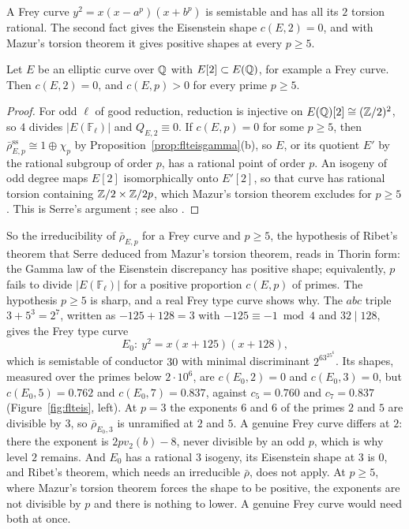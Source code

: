A Frey curve $y^2=x(x-a^p)(x+b^p)$ is semistable and has all its $2$ torsion rational. The second fact gives the Eisenstein shape $c(E,2)=0$, and with Mazur's torsion theorem it gives positive shapes at every $p\ge5$.

\begin{proposition}\label{prop:flteisfrey}
Let $E$ be an elliptic curve over $\mathbb{Q}$ with $E[2]\subset E(\mathbb{Q})$, for example a Frey curve. Then $c(E,2)=0$, and $c(E,p)>0$ for every prime $p\ge5$.
\end{proposition}

\begin{proof}
For odd $\ell$ of good reduction, reduction is injective on $E(\mathbb{Q})[2]\cong(\mathbb{Z}/2)^2$, so $4$ divides $|E(\mathbb F_\ell)|$ and $Q_{E,2}\equiv0$. If $c(E,p)=0$ for some $p\ge5$, then $\bar\rho_{E,p}^{\mathrm{ss}}\cong1\oplus\chi_p$ by Proposition~\ref{prop:flteisgamma}(b), so $E$, or its quotient $E'$ by the rational subgroup of order $p$, has a rational point of order $p$. An isogeny of odd degree maps $E[2]$ isomorphically onto $E'[2]$, so that curve has rational torsion containing $\mathbb{Z}/2\times\mathbb{Z}/2p$, which Mazur's torsion theorem \cite{mazur1977} excludes for $p\ge5$. This is Serre's argument \cite{serre1987}; see also \cite[Theorem~2.9(c)]{ddt1995}.
\end{proof}

So the irreducibility of $\bar\rho_{E,p}$ for a Frey curve and $p\ge5$, the hypothesis of Ribet's theorem that Serre deduced from Mazur's torsion theorem, reads in Thorin form: the Gamma law of the Eisenstein discrepancy has positive shape; equivalently, $p$ fails to divide $|E(\mathbb F_\ell)|$ for a positive proportion $c(E,p)$ of primes. The hypothesis $p\ge5$ is sharp, and a real Frey type curve shows why. The $abc$ triple $3+5^3=2^7$, written as $-125+128=3$ with $-125\equiv-1\bmod4$ and $32\mid128$, gives the Frey type curve
\[
E_0:\ y^2=x(x+125)(x+128),
\]
which is semistable of conductor $30$ with minimal discriminant $2^63^25^6$. Its shapes, measured over the primes below $2\cdot10^6$, are $c(E_0,2)=0$ and $c(E_0,3)=0$, but $c(E_0,5)=0.762$ and $c(E_0,7)=0.837$, against $c_5=0.760$ and $c_7=0.837$ (Figure~\ref{fig:flteis}, left). At $p=3$ the exponents $6$ and $6$ of the primes $2$ and $5$ are divisible by $3$, so $\bar\rho_{E_0,3}$ is unramified at $2$ and $5$. A genuine Frey curve differs at $2$: there the exponent is $2pv_2(b)-8$, never divisible by an odd $p$, which is why level $2$ remains. And $E_0$ has a rational $3$ isogeny, its Eisenstein shape at $3$ is $0$, and Ribet's theorem, which needs an irreducible $\bar\rho$, does not apply. At $p\ge5$, where Mazur's torsion theorem forces the shape to be positive, the exponents are not divisible by $p$ and there is nothing to lower. A genuine Frey curve would need both at once.

